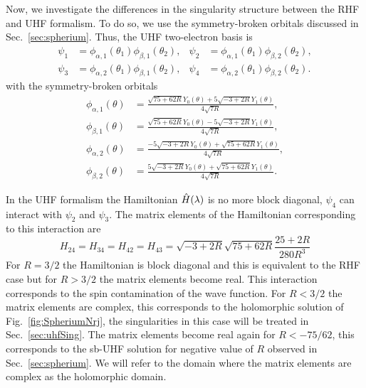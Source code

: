 \documentclass[11pt,a4paper]{article}
\newcommand{\hH}{\Hat{H}}
\begin{document}
Now, we investigate the differences in the singularity structure between the RHF and UHF formalism. To do so, we use the symmetry-broken orbitals discussed in Sec.~\ref{sec:spherium}. Thus, the UHF two-electron basis is
\begin{align}\label{eq:uhfbasis}
 \psi_1 & =\phi_{\alpha,1}(\theta_1)\phi_{\beta,1}(\theta_2),
 & 
 \psi_2 & =\phi_{\alpha,1}(\theta_1)\phi_{\beta,2}(\theta_2),\\
 \psi_3 & =\phi_{\alpha,2}(\theta_1)\phi_{\beta,1}(\theta_2),
 & 
 \psi_4 & =\phi_{\alpha,2}(\theta_1)\phi_{\beta,2}(\theta_2).
\end{align}
with the symmetry-broken orbitals
\begin{subequations}
\begin{align}\label{eq:uhforbitals}
 \phi_{\alpha,1}(\theta) & =\frac{\sqrt{75+62R}Y_{0}(\theta)+5\sqrt{-3+2R}Y_{1}(\theta)}{4\sqrt{7R}},
 \\ 
 \phi_{\beta,1}(\theta) & =\frac{\sqrt{75+62R}Y_{0}(\theta)-5\sqrt{-3+2R}Y_{1}(\theta)}{4\sqrt{7R}},
 \\
 \phi_{\alpha,2}(\theta) & =\frac{-5\sqrt{-3+2R}Y_{0}(\theta)+\sqrt{75+62R}Y_{1}(\theta)}{4\sqrt{7R}},
 \\
 \phi_{\beta,2}(\theta) & =\frac{5\sqrt{-3+2R}Y_{0}(\theta)+\sqrt{75+62R}Y_{1}(\theta)}{4\sqrt{7R}}.
\end{align}
\end{subequations}

In the UHF formalism the Hamiltonian $\hH(\lambda)$ is no more block diagonal, $\psi_4$ can interact with $\psi_2$ and $\psi_3$. The matrix elements of the Hamiltonian corresponding to this interaction are
\begin{equation}\label{eq:MatrixElem}
H_{24}=H_{34}=H_{42}=H_{43}=\sqrt{-3+2R}\sqrt{75+62R}\frac{25+2R}{280R^3}
\end{equation}
For $R=3/2$ the Hamiltonian is block diagonal and this is equivalent to the RHF case but for $R>3/2$ the matrix elements become real. This interaction corresponds to the spin contamination of the wave function. For $R<3/2$ the matrix elements are complex, this corresponds to the holomorphic solution of Fig.~\ref{fig:SpheriumNrj}, the singularities in this case will be treated in Sec.~\ref{sec:uhfSing}. The matrix elements become real again for $R<-75/62$, this corresponds to the sb-UHF solution for negative value of $R$ observed in Sec.~\ref{sec:spherium}. We will refer to the domain where the matrix elements are complex as the holomorphic domain.
\end{document}
